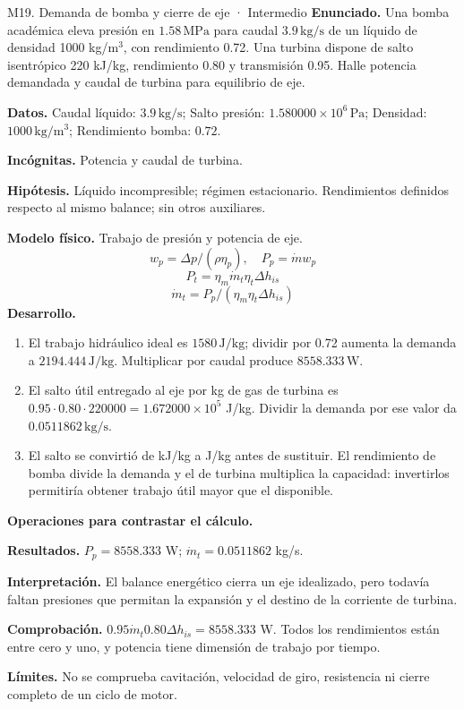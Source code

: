 \begin{studiumworked}{M19. Demanda de bomba y cierre de eje · Intermedio}
\textbf{Enunciado.} Una bomba académica eleva presión en $1.58\,\mathrm{MPa}$ para caudal $3.9\,\mathrm{kg/s}$ de un líquido de densidad 1000 kg/m$^3$, con rendimiento 0.72. Una turbina dispone de salto isentrópico 220 kJ/kg, rendimiento 0.80 y transmisión 0.95. Halle potencia demandada y caudal de turbina para equilibrio de eje.

\textbf{Datos.} Caudal líquido: $3.9\,\mathrm{kg/s}$; Salto presión: $1.580000\times10^{6}\,\mathrm{Pa}$; Densidad: $1000\,\mathrm{kg/m^3}$; Rendimiento bomba: $0.72$.

\textbf{Incógnitas.} Potencia y caudal de turbina.

\textbf{Hipótesis.} Líquido incompresible; régimen estacionario. Rendimientos definidos respecto al mismo balance; sin otros auxiliares.

\textbf{Modelo físico.} Trabajo de presión y potencia de eje.
\[w_p=\Delta p/(\rho\eta_p),\quad P_p=\dot m w_p\]
\[P_t=\eta_m\dot m_t\eta_t\Delta h_{is}\]
\[\dot m_t=P_p/(\eta_m\eta_t\Delta h_{is})\]
\textbf{Desarrollo.}
\begin{enumerate}
\item El trabajo hidráulico ideal es $1580\,\mathrm{J/kg}$; dividir por 0.72 aumenta la demanda a $2194.444\,\mathrm{J/kg}$. Multiplicar por caudal produce $8558.333\,\mathrm{W}$.
\item El salto útil entregado al eje por kg de gas de turbina es $0.95\cdot0.80\cdot220000=1.672000\times10^{5}$ J/kg. Dividir la demanda por ese valor da $0.0511862\,\mathrm{kg/s}$.
\item El salto se convirtió de kJ/kg a J/kg antes de sustituir. El rendimiento de bomba divide la demanda y el de turbina multiplica la capacidad: invertirlos permitiría obtener trabajo útil mayor que el disponible.
\end{enumerate}
\textbf{Operaciones para contrastar el cálculo.}

\textbf{Resultados.} $P_p=8558.333$ W; $\dot m_t=0.0511862$ kg/s.

\textbf{Interpretación.} El balance energético cierra un eje idealizado, pero todavía faltan presiones que permitan la expansión y el destino de la corriente de turbina.

\textbf{Comprobación.} $0.95\dot m_t0.80\Delta h_{is}=8558.333$ W. Todos los rendimientos están entre cero y uno, y potencia tiene dimensión de trabajo por tiempo.

\textbf{Límites.} No se comprueba cavitación, velocidad de giro, resistencia ni cierre completo de un ciclo de motor.
\end{studiumworked}
